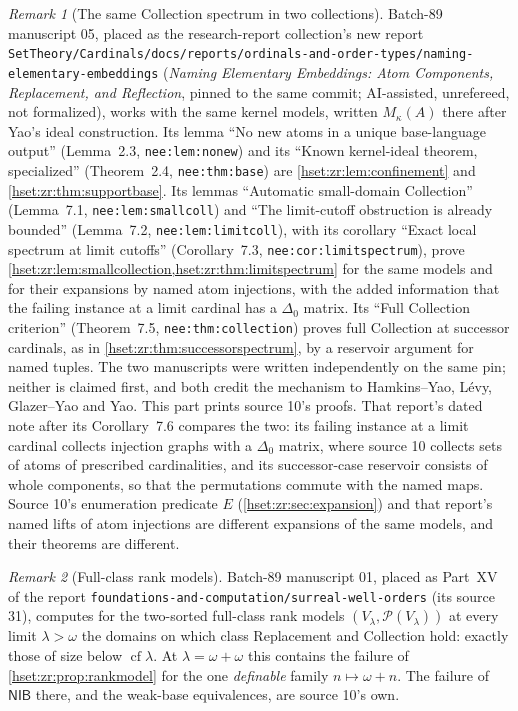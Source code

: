 \documentclass[11pt,letterpaper]{article}
\theoremstyle{definition}
\theoremstyle{remark}
\newtheorem{remark}[remark]{Remark}\aliascntresetthe{remark}
\newcommand{\Pow}{\mathcal P}
\newcommand{\cf}{\operatorname{cf}}
\newcommand{\lbl}[1]{\nolinkurl{#1}}
\newcommand{\repo}[1]{\nolinkurl{#1}}
\newcommand{\NIB}{\mathsf{NIB}}
\begin{document}
\begin{remark}[The same Collection spectrum in two collections]
\label{hset:zr:rem:nee}
Batch-89 manuscript 05, placed as the research-report collection's new report
\repo{SetTheory/Cardinals/docs/reports/ordinals-and-order-types/naming-elementary-embeddings}
(\emph{Naming Elementary Embeddings: Atom Components, Replacement, and
Reflection}, pinned to the same commit; AI-assisted, unrefereed, not
formalized), works with the same kernel models, written $M_\kappa(A)$ there
after Yao's ideal construction. Its lemma ``No new atoms in a unique
base-language output'' (Lemma~2.3, \lbl{nee:lem:nonew}) and its ``Known kernel-ideal
theorem, specialized'' (Theorem~2.4, \lbl{nee:thm:base}) are \cref{hset:zr:lem:confinement}
and \cref{hset:zr:thm:supportbase}. Its lemmas ``Automatic small-domain
Collection'' (Lemma~7.1, \lbl{nee:lem:smallcoll}) and ``The limit-cutoff obstruction is
already bounded'' (Lemma~7.2, \lbl{nee:lem:limitcoll}), with its corollary ``Exact local
spectrum at limit cutoffs'' (Corollary~7.3, \lbl{nee:cor:limitspectrum}), prove
\cref{hset:zr:lem:smallcollection,hset:zr:thm:limitspectrum} for the same models
and for their expansions by named atom injections, with the added information
that the failing instance at a limit cardinal has a $\Delta_0$ matrix. Its
``Full Collection criterion'' (Theorem~7.5, \lbl{nee:thm:collection}) proves full Collection
at successor cardinals, as in \cref{hset:zr:thm:successorspectrum}, by a
reservoir argument for named tuples. The two manuscripts were written
independently on the same pin; neither is claimed first, and both credit the
mechanism to Hamkins--Yao, L\'evy, Glazer--Yao and Yao. This part prints source
10's proofs. That report's dated note after its Corollary~7.6 compares the two:
its failing instance at a limit cardinal collects injection graphs with a
$\Delta_0$ matrix, where source 10 collects sets of atoms of prescribed
cardinalities, and its successor-case reservoir consists of whole components,
so that the permutations commute with the named maps. Source 10's enumeration predicate $E$
(\cref{hset:zr:sec:expansion}) and that report's named lifts of atom injections
are different expansions of the same models, and their theorems are different.
\end{remark}

\begin{remark}[Full-class rank models]
\label{hset:zr:rem:swo}
Batch-89 manuscript 01, placed as Part~XV of the report
\repo{foundations-and-computation/surreal-well-orders} (its source 31), computes
for the two-sorted full-class rank models $(V_\lambda,\Pow(V_\lambda))$ at every
limit $\lambda>\omega$ the domains on which class Replacement and Collection
hold: exactly those of size below $\cf\lambda$. At $\lambda=\omega+\omega$ this
contains the failure of \cref{hset:zr:prop:rankmodel} for the one
\emph{definable} family $n\mapsto\omega+n$. The failure of $\NIB$ there, and the
weak-base equivalences, are source 10's own.
\end{remark}
\end{document}
